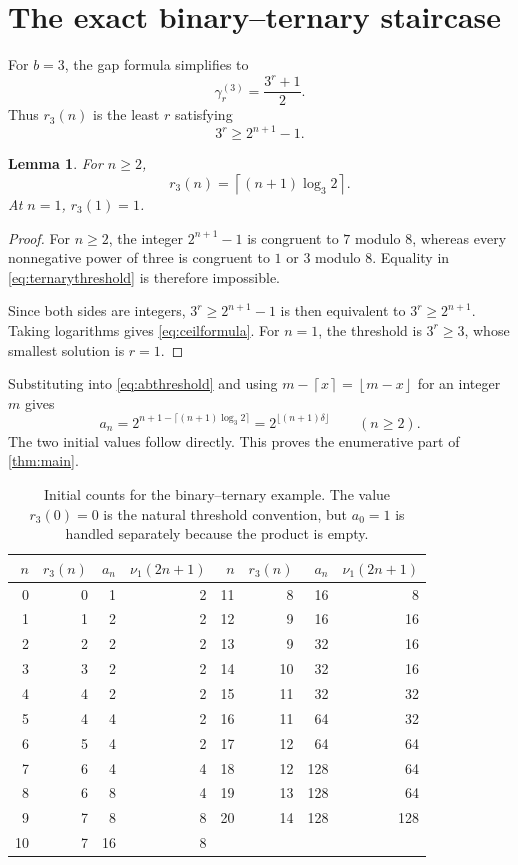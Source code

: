 \documentclass[11pt,letterpaper]{article}
\numberwithin{equation}{section}
\newtheorem{lemma}[lemma]{Lemma}
\theoremstyle{definition}
\theoremstyle{remark}
\newcommand{\floor}[1]{\left\lfloor#1\right\rfloor}
\newcommand{\ceil}[1]{\left\lceil#1\right\rceil}
\begin{document}
\section{The exact binary--ternary staircase}\label{sec:ternary}
For $b=3$, the gap formula simplifies to
\begin{equation}\label{eq:ternarygaps}
 \gamma_r^{(3)}=\frac{3^r+1}{2}.
\end{equation}
Thus $r_3(n)$ is the least $r$ satisfying
\begin{equation}\label{eq:ternarythreshold}
 3^r\ge2^{n+1}-1.
\end{equation}

\begin{lemma}\label{lem:ternarythreshold}
For $n\ge2$,
\begin{equation}\label{eq:ceilformula}
 r_3(n)=\ceil{(n+1)\log_3 2}.
\end{equation}
At $n=1$, $r_3(1)=1$.
\end{lemma}
\begin{proof}
For $n\ge2$, the integer $2^{n+1}-1$ is congruent to $7$ modulo $8$, whereas every nonnegative power of three is congruent to $1$ or $3$ modulo $8$. Equality in \eqref{eq:ternarythreshold} is therefore impossible.

Since both sides are integers, $3^r\ge2^{n+1}-1$ is then equivalent to $3^r\ge2^{n+1}$. Taking logarithms gives \eqref{eq:ceilformula}. For $n=1$, the threshold is $3^r\ge3$, whose smallest solution is $r=1$.
\end{proof}

Substituting into \eqref{eq:abthreshold} and using $m-\ceil{x}=\floor{m-x}$ for an integer $m$ gives
\[
 a_n=2^{n+1-\lceil(n+1)\log_3 2\rceil}
 =2^{\lfloor(n+1)\delta\rfloor}\qquad(n\ge2).
\]
The two initial values follow directly. This proves the enumerative part of \cref{thm:main}.

\begin{table}[htbp]
\centering
\small
\begin{tabular}{rrrr@{\hspace{1.5em}}rrrr}
\toprule
$n$&$r_3(n)$&$a_n$&$\nu_1(2n+1)$&$n$&$r_3(n)$&$a_n$&$\nu_1(2n+1)$\\
\midrule
0&0&1&2&11&8&16&8\\
1&1&2&2&12&9&16&16\\
2&2&2&2&13&9&32&16\\
3&3&2&2&14&10&32&16\\
4&4&2&2&15&11&32&32\\
5&4&4&2&16&11&64&32\\
6&5&4&2&17&12&64&64\\
7&6&4&4&18&12&128&64\\
8&6&8&4&19&13&128&64\\
9&7&8&8&20&14&128&128\\
10&7&16&8&&&&\\
\bottomrule
\end{tabular}
\caption{Initial counts for the binary--ternary example. The value $r_3(0)=0$ is the natural threshold convention, but $a_0=1$ is handled separately because the product is empty.}
\label{tab:counts}
\end{table}
\end{document}
